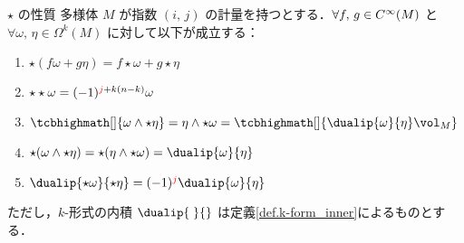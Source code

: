 \documentclass[geometry_main]{subfiles}
\begin{document}
\begin{myprop}[label=prop.Hodgestar]{$\star$ の性質}
	多様体 $M$ が指数 $(i,\, j)$ の計量を持つとする．$\forall f,\, g \in C^\infty(M)$ と $\forall \omega,\, \eta \in \Omega^k(M)$ に対して以下が成立する：
	\begin{enumerate} 
		\item $\star (f \omega + g \eta) = f \star \omega + g \star \eta$
		\item $\star \star \omega = (-1)^{\textcolor{red}{j} + k(n-k)} \omega$
		\item $\tcbhighmath[]{\omega \wedge \star \eta} = \eta \wedge \star \omega = \tcbhighmath[]{\dualip{\omega}{\eta} \vol_M}$
		\item $\star (\omega \wedge \star \eta) = \star (\eta \wedge \star \omega) = \dualip{\omega}{\eta}$
		\item $\dualip{\star \omega}{\star \eta} = (-1)^{\textcolor{red}{j}}\dualip{\omega}{\eta}$
	\end{enumerate}
	ただし，$k$-形式の内積 $\dualip{\;}{}$ は定義\ref{def.k-form_inner}によるものとする．
\end{myprop}
\end{document}
